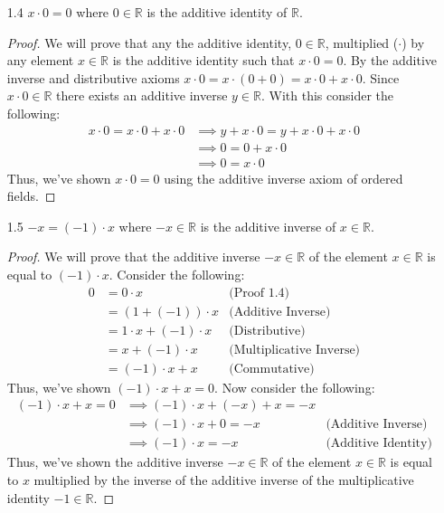 \documentclass[12pt, letterpaper]{article}
\theoremstyle{plain}
\theoremstyle{definition}
\theoremstyle{remark}
\begin{document}
\begin{itemize}
\item[1.4] $x\cdot 0=0$ where $0\in\mathbb{R}$ is the additive identity of $\mathbb{R}$.
\begin{proof}
We will prove that any the additive identity, $0\in\mathbb{R}$, multiplied ($\cdot$) by any element $x\in\mathbb{R}$ is the additive identity such that $x\cdot 0=0$. By the additive inverse and distributive axioms $x\cdot 0 = x\cdot (0+0)= x\cdot 0+x\cdot 0$. Since $x\cdot 0\in\mathbb{R}$ there exists an additive inverse $y\in\mathbb{R}$. With this consider the following:
\begin{align*}
    x\cdot 0 = x\cdot 0+x\cdot 0 &\implies y+x\cdot 0 = y+x\cdot 0+x\cdot 0 \\
                                 &\implies 0 = 0+x\cdot 0 \\
                                 &\implies 0 = x\cdot 0
\end{align*}
Thus, we've shown $x\cdot 0=0$ using the additive inverse axiom of ordered fields.
\end{proof}

\item[1.5] $-x=(-1)\cdot x$ where $-x\in\mathbb{R}$ is the additive inverse of $x\in\mathbb{R}$.
\begin{proof}
We will prove that the additive inverse $-x\in\mathbb{R}$ of the element $x\in\mathbb{R}$ is equal to $(-1)\cdot x$. Consider the following:
\begin{align*}
    0 &= 0\cdot x              &\text{(Proof 1.4)} \\
      &= (1+(-1))\cdot x       &\text{(Additive Inverse)} \\
      &= 1\cdot x +(-1)\cdot x &\text{(Distributive)} \\
      &= x+(-1)\cdot x         &\text{(Multiplicative Inverse)} \\
      &= (-1)\cdot x+x         &\text{(Commutative)}
\end{align*}
Thus, we've shown $(-1)\cdot x+x=0$. Now consider the following:
\begin{align*}
    (-1)\cdot x+x=0 &\implies (-1)\cdot x+(-x)+x=-x \\
                    &\implies (-1)\cdot x+0 = -x &\text{(Additive Inverse)} \\
                    &\implies (-1)\cdot x = -x   &\text{(Additive Identity)}
\end{align*}
Thus, we've shown the additive inverse $-x\in\mathbb{R}$ of the element $x\in\mathbb{R}$ is equal to $x$ multiplied by the inverse of the additive inverse of the multiplicative identity $-1\in\mathbb{R}$.
\end{proof}

\end{itemize}
\end{document}
